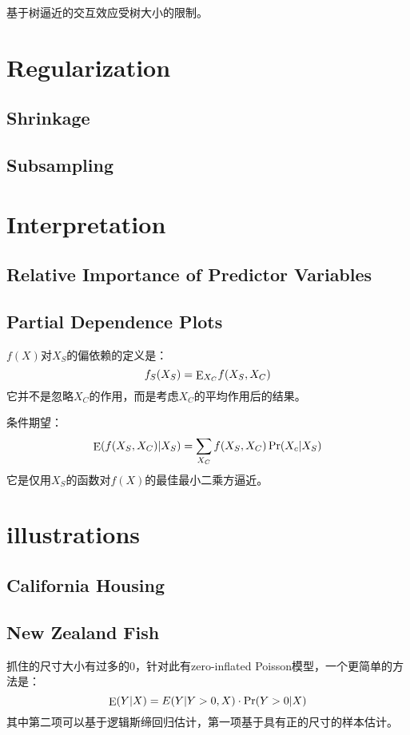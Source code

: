         基于树逼近的交互效应受树大小的限制。
    \section{Regularization}
        \subsection{Shrinkage}
        \subsection{Subsampling}
    \section{Interpretation}
        \subsection{Relative Importance of Predictor Variables}
        \subsection{Partial Dependence Plots}
            $f(X)$对$X_S$的偏依赖的定义是：
            \begin{equation}
              {f_S}({X_S}) = {{\mathop{\rm E}\nolimits} _{{X_C}}}f({X_S},{X_C})
            \end{equation}
            它并不是忽略$X_C$的作用，而是考虑$X_C$的平均作用后的结果。
            
            条件期望：
            \begin{equation}
              {\mathop{\rm E}\nolimits} (f({X_S},{X_C})|{X_S}) = \sum\limits_{{X_C}} {f({X_S}} ,{X_C})\Pr ({X_c}|{X_S})
            \end{equation}
            它是仅用$X_S$的函数对$f(X)$的最佳最小二乘方逼近。
    \section{illustrations}
        \subsection{California Housing}
        \subsection{New Zealand Fish}
            抓住的尺寸大小有过多的0，针对此有zero-inflated Poisson模型，一个更简单的方法是：
            \begin{equation}
              {\mathop{\rm E}\nolimits} (Y|X) = E(Y|Y > 0,X) \cdot \Pr (Y > 0|X)
            \end{equation}
            其中第二项可以基于逻辑斯缔回归估计，第一项基于具有正的尺寸的样本估计。
